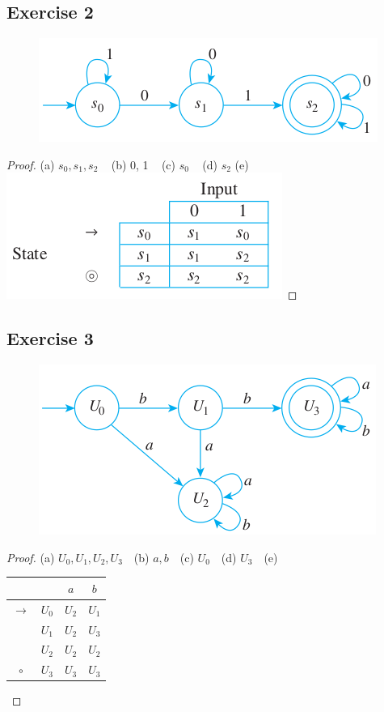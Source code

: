 \documentclass[14pt]{extarticle}
\begin{document}
\subsection{Exercise 2}
\begin{figure}[ht!]
\centering
\includegraphics[scale=0.5]{../images/12.2.2.png}
\end{figure}

\begin{proof}
(a) \(s_0, s_1, s_2\) \,\,\, (b) 0, 1 \,\,\, (c) \(s_0\) \,\,\, (d) \(s_2\) 
(e) \includegraphics[scale=0.5]{../images/12.2.2.e.png}
\end{proof}

\subsection{Exercise 3}
\begin{figure}[ht!]
\centering
\includegraphics[scale=0.5]{../images/12.2.3.png}
\end{figure}

\begin{proof}
(a) \(U_0, U_1, U_2, U_3\) \,\, (b) \(a, b\) \,\, (c) \(U_0\) \,\, (d) \(U_3\) \,\, (e) 
\begin{tabular}{|c|c|c|c|}
\hline
\(\) & \(\) & \(a\) & \(b\) \\
\hline
\(\to\) & \(U_0\) & \(U_2\) & \(U_1\) \\
\hline
\(\) & \(U_1\) & \(U_2\) & \(U_3\) \\
\hline
\(\) & \(U_2\) & \(U_2\) & \(U_2\) \\
\hline
\(\circ\) & \(U_3\) & \(U_3\) & \(U_3\) \\
\hline
\end{tabular}
\end{proof}
\end{document}
